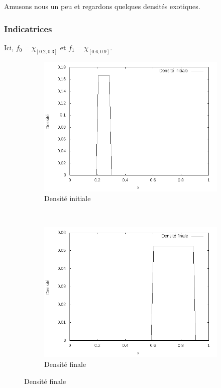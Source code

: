 \documentclass[a4paper,12pt]{article}
\begin{document}
\newpage


Amusons nous un peu et regardons quelques densités exotiques. 
\subsubsection{Indicatrices}
Ici, $f_0= \chi_{[0.2,0.3]}$ et $f_1=\chi_{[0.6,0.9]}$.
\begin{figure}[!h]
\centering 
	\begin{subfigure}[b]{0.48\linewidth}
	\includegraphics[width=\textwidth]{img/1DIndicatrix/f0.png}
	\caption{Densité initiale}
	\end{subfigure}
	~
	\begin{subfigure}[b]{0.48\linewidth}
	\includegraphics[width=\textwidth]{img/1DIndicatrix/f1.png}
	\caption{Densité finale}
	\end{subfigure}
	

\end{figure}
\end{document}
